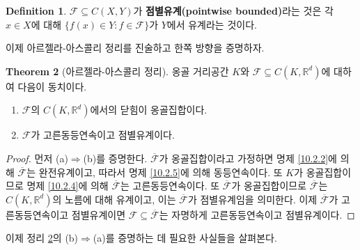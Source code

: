 \documentclass[11pt]{book}
\numberwithin{equation}{chapter}
\def\RR{\mathbb{R}}
\def\calF{\mathcal{F}}
\theoremstyle{definition}
\newtheorem{thm}{Theorem}[section]
\newtheorem{defn}[thm]{Definition}
\newenvironment{enum}
	{\begin{enumerate}[label=(\alph*), leftmargin=2\parindent]}
	{\end{enumerate}}
\begin{document}
\begin{defn}
    \(\calF \subseteq C(X, Y)\)가 \textbf{점별유계(pointwise bounded)}라는 것은 각 \(x \in X\)에 대해 \(\{f(x) \in Y : f \in \calF\}\)가 \(Y\)에서 유계라는 것이다.
\end{defn}

이제 아르젤라-아스콜리 정리를 진술하고 한쪽 방향을 증명하자.

\begin{thm}[아르젤라-아스콜리 정리] \label{10.2.7}
    옹골 거리공간 \(K\)와 \(\calF \subseteq C(K, \RR^d)\)에 대하여 다음이 동치이다.
    \begin{enum}
        \item \(\calF\)의 \(C(K, \RR^d)\)에서의 닫힘이 옹골집합이다.
        \item \(\calF\)가 고른동등연속이고 점별유계이다.
    \end{enum}
\end{thm}
\begin{proof}
    먼저 (a)\(\Rightarrow\)(b)를 증명한다. \(\overline{\calF}\)가 옹골집합이라고 가정하면 명제 \ref{10.2.2}에 의해 \(\overline{\calF}\)는 완전유계이고, 따라서 명제 \ref{10.2.5}에 의해 동등연속이다. 또 \(K\)가 옹골집합이므로 명제 \ref{10.2.4}에 의해 \(\overline{\calF}\)는 고른동등연속이다. 또 \(\overline{\calF}\)가 옹골집합이므로 \(\overline{\calF}\)는 \(C(K, \RR^d)\)의 노름에 대해 유계이고, 이는 \(\overline{\calF}\)가 점별유계임을 의미한다. 이제 \(\overline{\calF}\)가 고른동등연속이고 점별유계이면 \(\calF \subseteq \overline{\calF}\)는 자명하게 고른동등연속이고 점별유계이다.
\end{proof}

이제 정리 \ref{10.2.7}의 (b)\(\Rightarrow\)(a)를 증명하는 데 필요한 사실들을 살펴본다.
\end{document}
